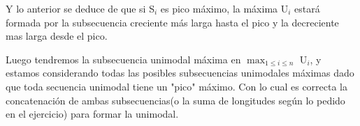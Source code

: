 Y lo anterior se deduce de que si S{$_i$} es pico máximo, la máxima U${_i}$ estará formada por la subsecuencia creciente más larga hasta el pico y la decreciente mas larga desde el pico. 

Luego tendremos la subsecuencia unimodal máxima en $\max_{1\leq i\leq n}$ U${_i}$, y estamos considerando todas las posibles subsecuencias unimodales máximas dado que toda secuencia unimodal tiene un "pico" máximo.
Con lo cual es correcta la concatenación de ambas subsecuencias(o la suma de longitudes según lo pedido en el ejercicio) para formar la unimodal. 
